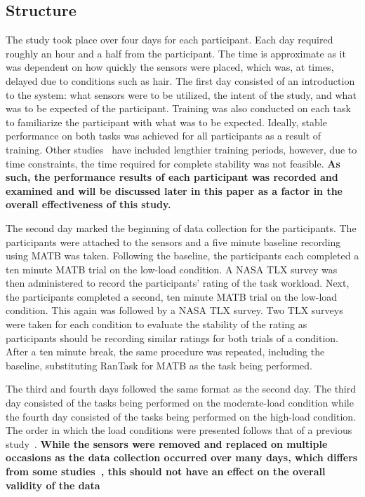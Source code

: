 \documentclass[11pt]{article}
\begin{document}
	\subsection{Structure} %
	The study took place over four days for each participant. Each day required roughly an hour and a half from the participant. The time is approximate as it was dependent on how quickly the sensors were placed, which was, at times, delayed due to conditions such as hair. The first day consisted of an introduction to the system: what sensors were to be utilized, the intent of the study, and what was to be expected of the participant. Training was also conducted on each task to familiarize the participant with what was to be expected. Ideally, stable performance on both tasks was achieved for all participants as a result of training. Other studies~\cite{Wilson} have included lengthier training periods, however, due to time constraints, the time required for complete stability was not feasible. 
	{\bf As such, the performance results of each participant was recorded and examined and will be discussed later in this paper as a factor in the overall effectiveness of this study. } %
	
	The second day marked the beginning of data collection for the participants. The participants were attached to the sensors and a five minute baseline recording using MATB was taken. Following the baseline, the participants each completed a ten minute MATB trial on the low-load condition. A NASA TLX survey was then administered to record the participants' rating of the task workload. Next, the participants completed a second, ten minute MATB trial on the low-load condition. This again was followed by a NASA TLX survey. Two TLX surveys were taken for each condition to evaluate the stability of the rating as participants should be recording similar ratings for both trials of a condition. After a ten minute break, the same procedure was repeated, including the baseline, substituting RanTask for MATB as the task being performed.
	
	The third and fourth days followed the same format as the second day. The third day consisted of the tasks being performed on the moderate-load condition while the fourth day consisted of the tasks being performed on the high-load condition. The order in which the load conditions were presented follows that of a previous study~\cite{Wilson}. {\bf While the sensors were removed and replaced on multiple occasions as the data collection occurred over many days, which differs from some studies~\cite{Wilson, ...}, this should not have an effect on the overall validity of the data~\cite{...}}
\end{document}
